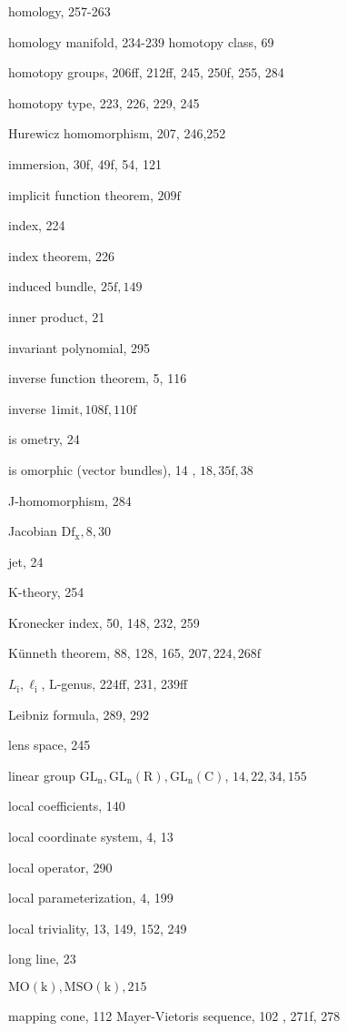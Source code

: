\documentclass[10pt]{article}
\begin{document}
homology, 257-263

homology manifold, 234-239 homotopy class, 69

homotopy groups, 206ff, 212ff, 245, 250f, 255, 284

homotopy type, 223, 226, 229, 245

Hurewicz homomorphism, 207, 246,252

immersion, 30f, 49f, 54, 121

implicit function theorem, $209 \mathrm{f}$

index, 224

index theorem, 226

induced bundle, $25 \mathrm{f}, 149$

inner product, 21

invariant polynomial, 295

inverse function theorem, 5, 116

inverse $1 \mathrm{imit}, 108 \mathrm{f}, 110 \mathrm{f}$

is ometry, 24

is omorphic (vector bundles), 14 , $18,35 \mathrm{f}, 38$

J-homomorphism, 284

Jacobian $\mathrm{Df}_{\mathrm{x}}, 8,30$

jet, 24

$\mathrm{K}$-theory, 254

Kronecker index, 50, 148, 232, 259

Künneth theorem, 88, 128, 165, $207,224,268 \mathrm{f}$

$L_{\mathrm{i}}, \ell_{\mathrm{i}}$, L-genus, 224ff, 231, 239ff

Leibniz formula, 289, 292

lens space, 245

linear group $\mathrm{GL}_{\mathrm{n}}, \mathrm{GL}_{\mathrm{n}}(\mathrm{R}), \mathrm{GL}_{\mathrm{n}}(\mathrm{C})$, $14,22,34,155$

local coefficients, 140

local coordinate system, 4, 13

local operator, 290

local parameterization, 4, 199

local triviality, 13, 149, 152, 249

long line, 23

$\mathrm{MO}(\mathrm{k}), \mathrm{MSO}(\mathrm{k}), 215$

mapping cone, 112 Mayer-Vietoris sequence, 102 , 271f, 278
\end{document}
